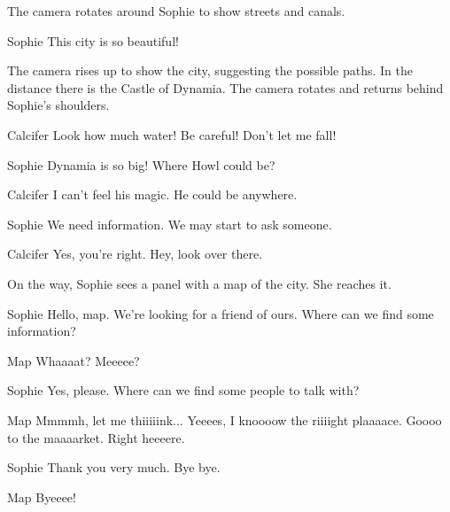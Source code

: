 \begin{screenplay}

The camera rotates around Sophie to show streets and canals. 

\begin{dialogue}[amazed]{Sophie}
This city is so beautiful!
\end{dialogue}

The camera rises up to show the city, suggesting the possible paths. In the distance there is the Castle of Dynamia. The camera rotates and returns behind Sophie's shoulders. 

\begin{dialogue}[worried]{Calcifer}
Look how much water! Be careful! Don't let me fall!
\end{dialogue}

\begin{dialogue}[discouraged]{Sophie}
Dynamia is so big! Where Howl could be?
\end{dialogue}

\begin{dialogue}{Calcifer}
I can't feel his magic. He could be anywhere.
\end{dialogue}

\begin{dialogue}[resolute]{Sophie}
We need information. We may start to ask someone.
\end{dialogue}

\begin{dialogue}{Calcifer}
Yes, you're right. Hey, look over there.
\end{dialogue}

On the way, Sophie sees a panel with a map of the city. She reaches it.

\begin{dialogue}{Sophie}
Hello, map. We're looking for a friend of ours. Where can we find some information?
\end{dialogue}

\begin{dialogue}[tired]{Map}
Whaaaat? Meeeee?
\end{dialogue}

\begin{dialogue}{Sophie}
Yes, please. Where can we find some people to talk with?
\end{dialogue}

\begin{dialogue}[tired]{Map}
Mmmmh, let me thiiiiink... Yeeees, I knoooow the riiiight plaaaace. Goooo to the maaaarket. Right heeeere.
\end{dialogue}

\begin{dialogue}{Sophie}
Thank you very much. Bye bye.
\end{dialogue}

\begin{dialogue}[tired]{Map}
Byeeee!
\end{dialogue}

\end{screenplay}
\vspace{1em}

